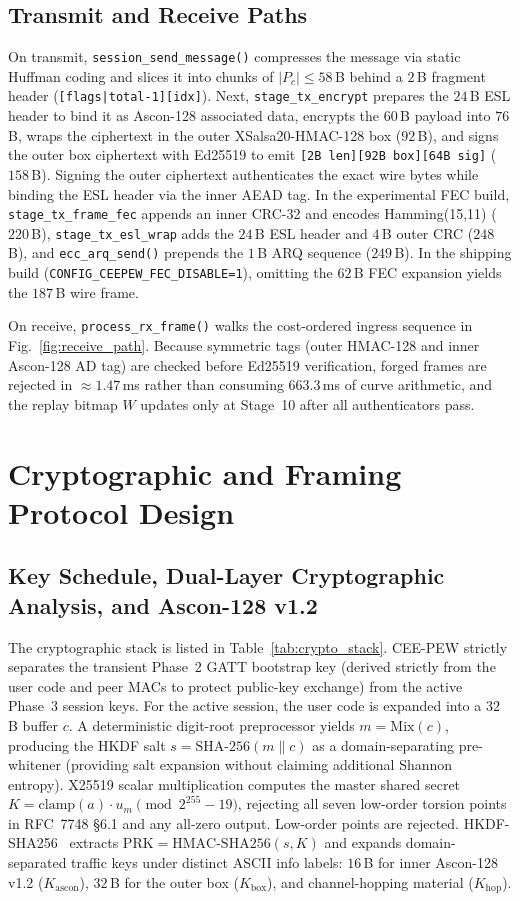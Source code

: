 \documentclass[conference]{IEEEtran}
\begin{document}
\subsection{Transmit and Receive Paths}
On transmit, \texttt{session\_send\_message()} compresses the message via static Huffman coding and slices it into chunks of $|P_c|\le 58$\,B behind a $2$\,B fragment header (\texttt{[flags|total-1][idx]}). Next, \texttt{stage\_tx\_encrypt} prepares the $24$\,B ESL header to bind it as Ascon-128 associated data, encrypts the $60$\,B payload into $76$\,B, wraps the ciphertext in the outer XSalsa20-HMAC-128 box ($92$\,B), and signs the outer box ciphertext with Ed25519 to emit \texttt{[2B len][92B box][64B sig]} ($158$\,B). Signing the outer ciphertext authenticates the exact wire bytes while binding the ESL header via the inner AEAD tag. In the experimental FEC build, \texttt{stage\_tx\_frame\_fec} appends an inner CRC-32 and encodes Hamming(15,11) ($220$\,B), \texttt{stage\_tx\_esl\_wrap} adds the $24$\,B ESL header and $4$\,B outer CRC ($248$\,B), and \texttt{ecc\_arq\_send()} prepends the $1$\,B ARQ sequence ($249$\,B). In the shipping build (\texttt{CONFIG\_CEEPEW\_FEC\_DISABLE=1}), omitting the $62$\,B FEC expansion yields the $187$\,B wire frame.

On receive, \texttt{process\_rx\_frame()} walks the cost-ordered ingress sequence in Fig.~\ref{fig:receive_path}. Because symmetric tags (outer HMAC-128 and inner Ascon-128 AD tag) are checked before Ed25519 verification, forged frames are rejected in $\approx 1.47$\,ms rather than consuming $663.3$\,ms of curve arithmetic, and the replay bitmap $W$ updates only at Stage~10 after all authenticators pass.

\section{Cryptographic and Framing Protocol Design}

\subsection{Key Schedule, Dual-Layer Cryptographic Analysis, and Ascon-128 v1.2}
The cryptographic stack is listed in Table~\ref{tab:crypto_stack}. CEE-PEW strictly separates the transient Phase~2 GATT bootstrap key (derived strictly from the user code and peer MACs to protect public-key exchange) from the active Phase~3 session keys. For the active session, the user code is expanded into a $32$\,B buffer $c$. A deterministic digit-root preprocessor yields $m = \text{Mix}(c)$, producing the HKDF salt $s = \text{SHA-256}(m \parallel c)$ as a domain-separating pre-whitener (providing salt expansion without claiming additional Shannon entropy). X25519 scalar multiplication computes the master shared secret $K = \text{clamp}(a)\cdot u_m \pmod{2^{255}-19}$, rejecting all seven low-order torsion points in RFC~7748 \S6.1 and any all-zero output. Low-order points are rejected. HKDF-SHA256~\cite{rfc5869} extracts $\text{PRK} = \text{HMAC-SHA256}(s, K)$ and expands domain-separated traffic keys under distinct ASCII info labels: $16$\,B for inner Ascon-128 v1.2 ($K_{\text{ascon}}$), $32$\,B for the outer box ($K_{\text{box}}$), and channel-hopping material ($K_{\text{hop}}$).
\end{document}
